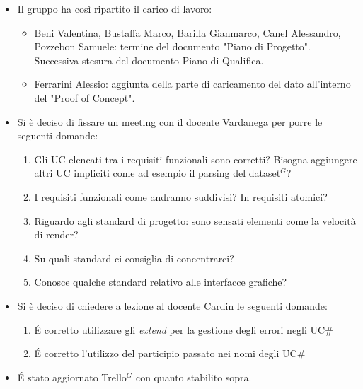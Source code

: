 \begin{itemize}
	\item Il gruppo ha così ripartito il carico di lavoro:
	\begin{itemize}
		\item Beni Valentina, Bustaffa Marco, Barilla Gianmarco, Canel Alessandro, Pozzebon Samuele: termine del documento "Piano di Progetto". Successiva stesura del documento Piano di Qualifica. 
		\item Ferrarini Alessio: aggiunta della parte di caricamento del dato all'interno del "Proof of Concept".
	\end{itemize}
	\item Si è deciso di fissare un meeting con il docente Vardanega per porre le seguenti domande:
	\begin{enumerate}
		\item Gli UC elencati tra i requisiti funzionali sono corretti? Bisogna aggiungere altri UC impliciti come ad esempio il parsing del dataset$^{G}$?
		\item I requisiti funzionali come andranno suddivisi? In requisiti atomici?
		\item Riguardo agli standard di progetto: sono sensati elementi come la velocità di render?
		\item Su quali standard ci consiglia di concentrarci?
		\item Conosce qualche standard relativo alle interfacce grafiche?
	\end{enumerate}
	\item Si è deciso di chiedere a lezione al docente Cardin le seguenti domande:
	\begin{enumerate}
		\item \' E corretto utilizzare gli \textit{extend} per la gestione degli errori negli UC\#
		\item \' E corretto l'utilizzo del participio passato nei nomi degli UC\#
	\end{enumerate}
	\item \' E stato aggiornato Trello$^{G}$ con quanto stabilito sopra.
\end{itemize}
